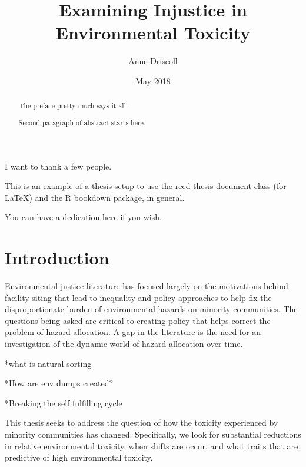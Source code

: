 \documentclass[12pt,twoside]{dukestatscithesis}
\title{Examining Injustice in Environmental Toxicity}
\author{Anne Driscoll}
\date{May 2018}
\theoremstyle{definition}
\theoremstyle{definition}
\theoremstyle{definition}
\theoremstyle{remark}
\begin{document}
  \maketitle

\frontmatter %
\pagestyle{empty} %
  \begin{acknowledgements}
    I want to thank a few people.
  \end{acknowledgements}
  \begin{preface}
    This is an example of a thesis setup to use the reed thesis document
    class (for LaTeX) and the R bookdown package, in general.
  \end{preface}
  \hypersetup{linkcolor=black}
  \setcounter{tocdepth}{2}
  \tableofcontents

  \listoftables

  \listoffigures
  \begin{abstract}
    The preface pretty much says it all. \par
    
    Second paragraph of abstract starts here.
  \end{abstract}
  \begin{dedication}
    You can have a dedication here if you wish.
  \end{dedication}
\mainmatter %
\pagestyle{fancyplain} %

\chapter*{Introduction}\label{introduction}

Environmental justice literature has focused largely on the motivations
behind facility siting that lead to inequality and policy approaches to
help fix the disproportionate burden of environmental hazards on
minority communities. The questions being asked are critical to creating
policy that helps correct the problem of hazard allocation. A gap in the
literature is the need for an investigation of the dynamic world of
hazard allocation over time.

*what is natural sorting

*How are env dumps created?

*Breaking the self fulfilling cycle

This thesis seeks to address the question of how the toxicity
experienced by minority communities has changed. Specifically, we look
for substantial reductions in relative environmental toxicity, when
shifts are occur, and what traits that are predictive of high
environmental toxicity.
\end{document}
